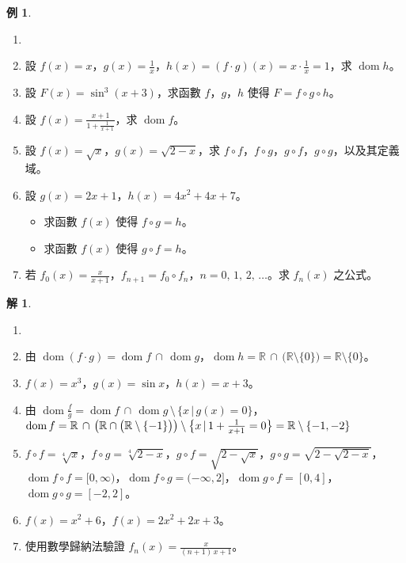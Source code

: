 \documentclass[12pt]{extarticle}
\newcommand{\ds}{\displaystyle}
\DeclareMathOperator*{\dom}{dom}
\theoremstyle{definition}
\newtheorem*{ex}{例}
\newtheorem*{sol}{解}
\begin{document}
\begin{ex}
  \begin{enumerate}\setlength\itemsep{0em}
    \item[]
    \item 設 $f(x) = x$，$\ds g(x) = \frac{1}{x}$，$\ds h(x) = (f\cdot g)(x) = x\cdot\frac{1}{x} = 1$，求 $\dom h$。
    \item 設 $F(x) = \sin^3(x + 3)$，求函數 $f$，$g$，$h$ 使得 $F = f\circ g\circ h$。
    \item 設 $\ds f(x) = \frac{x + 1}{1 + \frac{1}{x + 1}}$，求 $\dom f$。
    \item 設 $\ds f(x) = \sqrt{x}$，$g(x) = \sqrt{2 - x}$，求 $f\circ f$，$f\circ g$，$g\circ f$，$g\circ g$，以及其定義域。
    \item 設 $\ds g(x) = 2x + 1$，$h(x) = 4x^2 + 4x + 7$。
      \begin{itemize}\setlength\itemsep{0em}
        \item 求函數 $f(x)$ 使得 $f\circ g = h$。
        \item 求函數 $f(x)$ 使得 $g\circ f = h$。
      \end{itemize}
    \item 若 $\ds f_0(x) = \frac{x}{x + 1}$，$\ds f_{n+1} = f_0\circ f_n$，$n = 0,\,1,\,2,\,\ldots$。求 $f_n(x)$ 之公式。 
  \end{enumerate}
\end{ex}

\begin{sol}
  \begin{enumerate}\setlength\itemsep{0em}
    \item[] 
    \item 由 $\dom(f\cdot g) = \dom f\,\cap\,\dom g$，$\dom h = \mathbb{R}\,\cap\,\big(\mathbb{R}\setminus\{0\}\big) = \mathbb{R}\setminus\{0\}$。
    \item $f(x) = x^3$，$g(x) = \sin x$，$h(x) = x + 3$。
    \item 由 $\ds\dom\frac{f}{g} = \dom f\,\cap\,\dom g\,\setminus\,\{ x\,|\,g(x) = 0\}$，$\dom f = \mathbb{R}\,\cap\,\big(\mathbb{R}\cap\big(\mathbb{R}\setminus\{-1\}\big)\big)\setminus\big\{x\,|\,1 + \frac{1}{x + 1} = 0\big\} \\= \mathbb{R}\setminus\{-1, -2\}$
    \item $f\circ f = \sqrt[4]{x}$，$f\circ g = \sqrt[4]{2 - x}$，$g\circ f = \sqrt{2 - \sqrt{x}}$，$g\circ g = \sqrt{2 - \sqrt{2 - x}}$，$\dom f\circ f = [0, \infty)$，$\dom f\circ g = (-\infty, 2]$，$\dom g\circ f = [0, 4]$，$\dom g\circ g = [-2, 2]$。
    \item $f(x) = x^2 + 6$，$f(x) = 2x^2 + 2x + 3$。
    \item 使用數學歸納法驗證 $\ds f_n(x) = \frac{x}{(n + 1)\,x + 1}$。
  \end{enumerate}
\end{sol}
\end{document}
